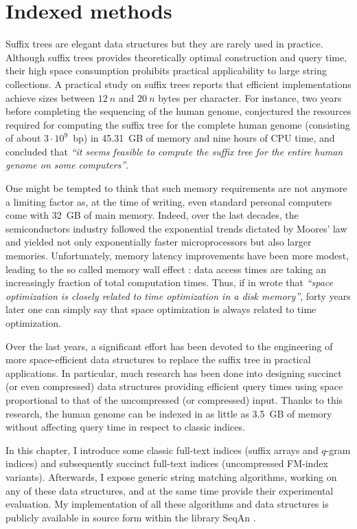 \chapter{Indexed methods}
\label{chr:index}

Suffix trees are elegant data structures but they are rarely used in practice.
Although suffix trees provides theoretically optimal construction and query time, their high space consumption prohibits practical applicability to large string collections.
A practical study on suffix trees \citep{Kurtz1999} reports that efficient implementations achieve sizes between $12~n$ and $20~n$ bytes per character.
For instance, two years before completing the sequencing of the human genome, \citeauthor{Kurtz1999} conjectured the resources required for computing the suffix tree for the complete human genome (consisting of about $3 \cdot 10^9$~bp) in 45.31~GB of memory and nine hours of CPU time, and concluded that \emph{``it seems feasible to compute the suffix tree for the entire human genome on some computers''}.

One might be tempted to think that such memory requirements are not anymore a limiting factor as, at the time of writing, even standard personal computers come with 32~GB of main memory.
Indeed, over the last decades, the semiconductors industry followed the exponential trends dictated by Moores' law and yielded not only exponentially faster microprocessors but also larger memories.
Unfortunately, memory latency improvements have been more modest, leading to the so called memory wall effect \citep{Wilkes1995}: data access times are taking an increasingly fraction of total computation times.
Thus, if in \citeyear{Knuth1973} \citeauthor{Knuth1973} wrote that \emph{``space optimization is closely related to time optimization in a disk memory''}, forty years later one can simply say that space optimization is always related to time optimization.

Over the last years, a significant effort has been devoted to the engineering of more space-efficient data structures to replace the suffix tree in practical applications.
In particular, much research has been done into designing succinct (or even compressed) data structures providing efficient query times using space proportional to that of the uncompressed (or compressed) input.
Thanks to this research, the human genome can be indexed in as little as 3.5~GB of memory without affecting query time in respect to classic indices.

In this chapter, I introduce some classic full-text indices (suffix arrays and $q$-gram indices) and subsequently succinct full-text indices (uncompressed FM-index variants).
Afterwards, I expose generic string matching algorithms, working on any of these data structures, and at the same time provide their experimental evaluation.
My implementation of all these algorithms and data structures is publicly available in source form within the \CC library SeqAn \citep{Doering2008}.

